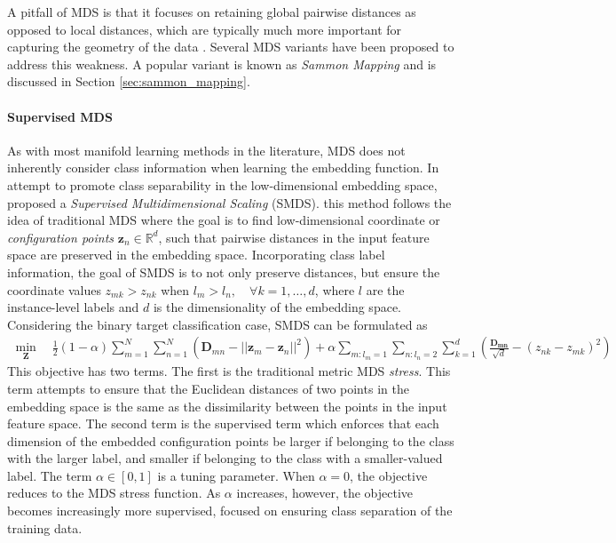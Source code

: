 A pitfall of MDS is that it focuses on retaining global pairwise distances as opposed to local distances, which are typically much more important for capturing the geometry of the data \citep{VanDerMaaten2009DRReview}.  Several MDS variants have been proposed to address this weakness.  A popular variant is known as \textit{Sammon Mapping} and is discussed in Section \ref{sec:sammon_mapping}. 

\paragraph{Supervised MDS}
As with most manifold learning methods in the literature, MDS does not inherently consider class information when learning the embedding function.  In attempt to promote class separability in the  low-dimensional embedding space, \cite{Witten2011SuperMDS} proposed a \textit{Supervised Multidimensional Scaling} (SMDS).  this method follows the idea of traditional MDS where the goal is to find low-dimensional coordinate or \textit{configuration points} $\bm{z}_{n} \in \mathbb{R}^{d}$, such that pairwise distances in the input feature space are preserved in the  embedding space.  Incorporating class label information, the goal of SMDS is to not only preserve distances, but ensure the coordinate values $z_{mk} > z_{nk}$ when $l_{m} > l_{n}, \quad \forall k = 1, \dots, d$, where $l$ are the instance-level labels and $d$ is the dimensionality of the embedding space.  Considering the binary target classification case, SMDS can be formulated as
\begin{align}
	\min_{\bm{Z}} \quad \frac{1}{2}(1-\alpha)\sum_{m=1}^{N}\sum_{n=1}^{N}(\bm{D}_{mn} - ||\bm{z}_{m} - \bm{z}_{n} ||^{2}) + \alpha \sum_{m:l_{m}=1} \sum_{n:l_n=2} \sum_{k=1}^{d}\left(\frac{\bm{D_{mn}}}{\sqrt{d}} - (z_{nk} - z_{mk})^{2} \right)
\end{align}
This objective has two terms.  The first is the traditional metric MDS \textit{stress}.  This term attempts to ensure that the Euclidean distances of two points in the embedding space is the same as the dissimilarity between the points in the input feature space.  The second term is the supervised term which enforces that each dimension of the embedded configuration points be larger if belonging to the class with the larger label, and smaller if belonging to the class with a smaller-valued label.  The term $\alpha \in [0,1]$ is a tuning parameter.  When $\alpha = 0$, the objective reduces to the MDS stress function.  As $\alpha$ increases, however, the objective becomes increasingly more supervised, focused on ensuring class separation of the training data.

